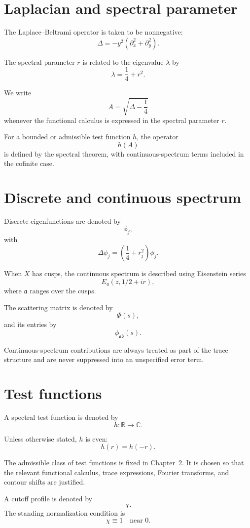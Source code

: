 \section*{Laplacian and spectral parameter}

The Laplace--Beltrami operator is taken to be nonnegative:
\[
  \Delta=-y^2(\partial_x^2+\partial_y^2).
\]

The spectral parameter \(r\) is related to the eigenvalue \(\lambda\) by
\[
  \lambda=\frac14+r^2.
\]

We write
\[
  A=\sqrt{\Delta-\frac14}
\]
whenever the functional calculus is expressed in the spectral parameter \(r\).

For a bounded or admissible test function \(h\), the operator
\[
  h(A)
\]
is defined by the spectral theorem, with continuous-spectrum terms included in the cofinite case.

\section*{Discrete and continuous spectrum}

Discrete eigenfunctions are denoted by
\[
  \phi_j,
\]
with
\[
  \Delta\phi_j=
  \left(\frac14+r_j^2\right)\phi_j.
\]

When \(X\) has cusps, the continuous spectrum is described using Eisenstein series
\[
  E_{\mathfrak a}(z,1/2+ir),
\]
where \(\mathfrak a\) ranges over the cusps.

The scattering matrix is denoted by
\[
  \Phi(s),
\]
and its entries by
\[
  \phi_{\mathfrak a\mathfrak b}(s).
\]

Continuous-spectrum contributions are always treated as part of the trace structure and are never suppressed into an unspecified error term.

\section*{Test functions}

A spectral test function is denoted by
\[
  h:\mathbb R\to\mathbb C.
\]

Unless otherwise stated, \(h\) is even:
\[
  h(r)=h(-r).
\]

The admissible class of test functions is fixed in Chapter~2.  It is chosen so that the relevant functional calculus, trace expressions, Fourier transforms, and contour shifts are justified.

A cutoff profile is denoted by
\[
  \chi.
\]
The standing normalization condition is
\[
  \chi\equiv1
  \quad\text{near }0.
\]


